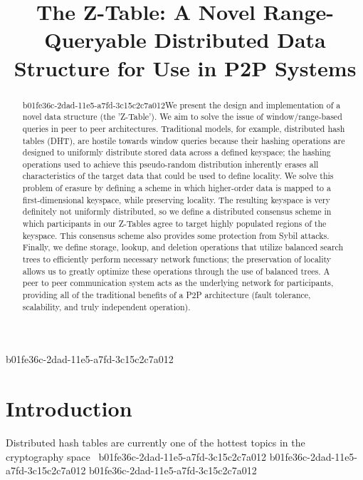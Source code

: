\documentclass[12pt]{article}
\title{The Z-Table: A Novel Range-Queryable Distributed Data Structure for Use in P2P Systems}
\begin{document}
\maketitle
b01fe36c-2dad-11e5-a7fd-3c15c2c7a012
\begin{abstract}
b01fe36c-2dad-11e5-a7fd-3c15c2c7a012We present the design and implementation of a novel data structure (the 'Z-Table'). We aim to solve the issue of window/range-based queries in peer to peer architectures. Traditional models, for example,  distributed hash tables (DHT), are hostile towards window queries because their hashing operations are designed to uniformly distribute stored data across a defined keyspace; the hashing operations used to achieve this pseudo-random distribution inherently erases all characteristics of the target data that could be used to define locality. We solve this problem of erasure by defining a scheme in which higher-order data is mapped to a first-dimensional keyspace, while preserving locality. The resulting keyspace is very definitely not uniformly distributed, so we define a distributed consensus scheme in which participants in our Z-Tables agree to target highly populated regions of the keyspace. This consensus scheme also provides some protection from Sybil attacks. Finally, we define storage, lookup, and deletion operations that utilize balanced search trees to efficiently perform necessary network functions; the preservation of locality allows us to greatly optimize these operations through the use of balanced trees. A peer to peer communication system acts as the underlying network for participants, providing all of the traditional benefits of a P2P architecture (fault tolerance, scalability, and truly independent operation).
\end{abstract}


\newpage
\section{Introduction}
Distributed hash tables are currently one of the hottest topics in the cryptography space~\cite{Stoica:2001dj,Rowstron:2001ea,Ratnasamy:2001wn}
b01fe36c-2dad-11e5-a7fd-3c15c2c7a012
b01fe36c-2dad-11e5-a7fd-3c15c2c7a012\printbibliography
b01fe36c-2dad-11e5-a7fd-3c15c2c7a012
\end{document}
